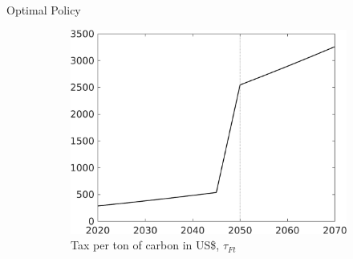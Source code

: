 \documentclass[11pt,aspectratio=169]{beamer}
\begin{document}
\begin{frame}{Optimal Policy}
	\pause
	\vspace{-3mm}
	\begin{figure}[h!!]
		
		\begin{subfigure}{0.45\textwidth}		
			\caption{Tax per ton of carbon in US\$, $\tau_{Ft}$}
			\includegraphics[width=1\textwidth]{../codding_model/own_basedOnFried/optimalPol_010922_revision/figures/all_13Sept22/Single_NC_T_Tauf_emnet1_Sun2_regime4_spillover0_knspil3_noskill0_sep0_xgrowth0_extern0_PV1_sizeequ0_GOV0_etaa0.79.png}
		\end{subfigure}	
		\begin{minipage}[]{0.05\textwidth}
			\ 
		\end{minipage}
		\begin{subfigure}{0.45\textwidth}	
			\	
		\end{subfigure}
	\end{figure}
	\vspace{3mm}
\end{frame}

\addtocounter{framenumber}{-1}
\end{document}
